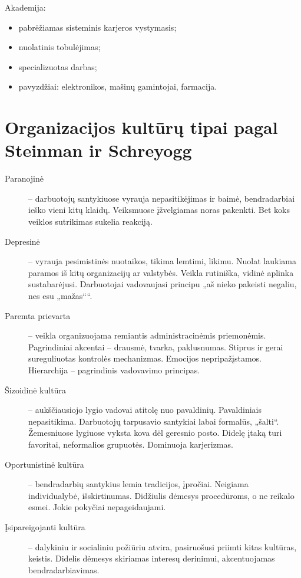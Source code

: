 Akademija:
\begin{itemize}
  \item pabrėžiamas sisteminis karjeros vystymasis;
  \item nuolatinis tobulėjimas;
  \item specializuotas darbas;
  \item pavyzdžiai: elektronikos, mašinų gamintojai, farmacija.
\end{itemize}

\section{Organizacijos kultūrų tipai pagal Steinman ir Schreyogg}

\begin{description}
  \item[Paranojinė] – darbuotojų santykiuose vyrauja nepasitikėjimas ir
    baimė, bendradarbiai ieško vieni kitų klaidų. Veiksmuose įžvelgiamas
    noras pakenkti. Bet koks veiklos sutrikimas sukelia reakciją.
  \item[Depresinė] – vyrauja pesimistinės nuotaikos, tikima lemtimi, likimu.
    Nuolat laukiama paramos iš kitų organizacijų ar valstybės. Veikla
    rutiniška, vidinė aplinka sustabarėjusi. Darbuotojai vadovaujasi
    principu „aš nieko pakeisti negaliu, nes esu „mažas““.
  \item[Paremta prievarta] – veikla organizuojama remiantis
    administracinėmis priemonėmis. Pagrindiniai akcentai – drausmė, tvarka,
    paklusnumas. Stiprus ir gerai sureguliuotas kontrolės mechanizmas.
    Emocijos nepripažįstamos. Hierarchija – pagrindinis vadovavimo
    principas.
  \item[Šizoidinė kultūra] – aukščiausiojo lygio vadovai atitolę nuo
    pavaldinių. Pavaldiniais nepasitikima. Darbuotojų tarpusavio santykiai
    labai formalūs, „šalti“. Žemesniuose lygiuose vyksta kova dėl geresnio
    posto. Didelę įtaką turi favoritai, neformalios grupuotės. Dominuoja
    karjerizmas.
  \item[Oportunistinė kultūra] – bendradarbių santykius lemia tradicijos,
    įpročiai. Neigiama individualybė, išskirtinumas. Didžiulis dėmesys
    procedūroms, o ne reikalo esmei. Jokie pokyčiai nepageidaujami.
  \item[Įsipareigojanti kultūra] – dalykiniu ir socialiniu požiūriu atvira,
    pasiruošusi priimti kitas kultūras, keistis. Didelis dėmesys skiriamas
    interesų derinimui, akcentuojamas bendradarbiavimas.
\end{description}

